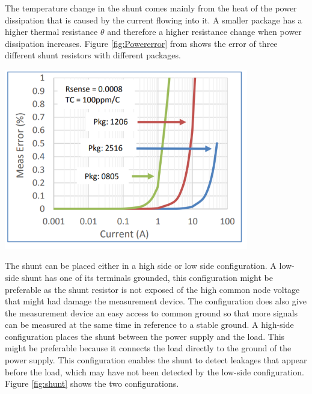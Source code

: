 The temperature change in the shunt comes mainly from the heat of the power dissipation that is caused by the current flowing into it. A smaller package has a higher thermal resistance $\theta$ and therefore a higher resistance change when power dissipation increases. Figure \ref{fig:Powererror} from \cite{Intersil} shows the error of three different shunt resistors with different packages. 

\begin{minipage}[t]{0.8\textwidth}
\centering
    \includegraphics[width=0.8\textwidth]{Images/Powererror.PNG}\\
    \captionsetup{justification=centering}
    \label{fig:Powererror}
\end{minipage}



\hfill \break
The shunt can be placed either in a high side or low side configuration. A low-side shunt has one of its terminals grounded, this configuration might be preferable as the shunt resistor is not exposed of the high common node voltage that might had damage the measurement device. The configuration does also give the measurement device an easy access to common ground so that more signals can be measured at the same time in reference to a stable ground. A high-side configuration places the shunt between the power supply and the load. This might be preferable because it connects the load directly to the ground of the power supply. This configuration enables the shunt to detect leakages that appear before the load, which may have not been detected by the low-side configuration. Figure \ref{fig:shunt} shows the two configurations. \hfill \break


